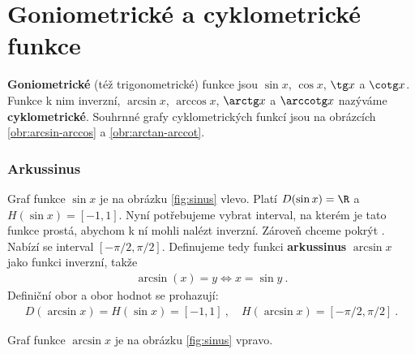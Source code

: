 \section*{Goniometrické a cyklometrické funkce}

\textbf{Goniometrické} (též trigonometrické) funkce jsou $\sin x$, $\cos x$, $\tg x$ a $\cotg x$. Funkce k nim inverzní, $\arcsin x$, $\arccos x$, $\arctg x$ a $\arccotg x$ nazýváme \textbf{cyklometrické}. Souhrnné grafy cyklometrických funkcí jsou na obrázcích \ref{obr:arcsin-arccos} a \ref{obr:arctan-arccot}.

\subsubsection*{Arkussinus}

Graf funkce $\sin x$ je na obrázku \ref{fig:sinus} vlevo. Platí $D(\sin x) = \R$ a $H(\sin x) = [-1,1]$. Nyní potřebujeme vybrat interval, na kterém je tato funkce prostá, abychom k ní mohli nalézt inverzní. Zároveň chceme pokrýt . Nabízí se interval $[-\pi/2, \pi/2]$. Definujeme tedy funkci \textbf{arkussinus} $\arcsin x$ jako funkci inverzní, takže \begin{align}
    \arcsin(x) = y \Longleftrightarrow x = \sin y \:.
\end{align}
Definiční obor a obor hodnot se prohazují:
\begin{align}
    D(\arcsin x) = H(\sin x) = [-1,1] \:, \quad H(\arcsin x) = [-\pi/2, \pi/2] \:.
\end{align}

Graf funkce $\arcsin x$ je na obrázku \ref{fig:sinus} vpravo.

